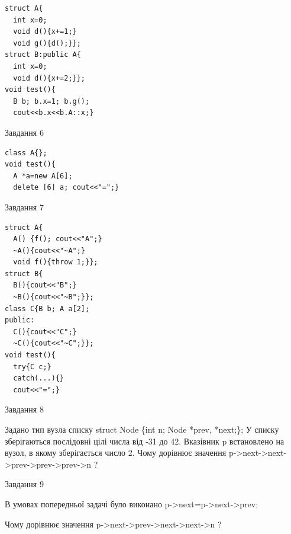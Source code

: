 \documentclass[12pt, ukrainian]{article}
\begin{document}
{{{{{{{{{{{{{{{{\begin{minipage}[t]{7cm}
\begin{verbatim}
struct A{
  int x=0;
  void d(){x+=1;}
  void g(){d();}};
struct B:public A{
  int x=0;
  void d(){x+=2;}};
void test(){
  B b; b.x=1; b.g();
  cout<<b.x<<b.A::x;}
\end{verbatim}            


               
{\begin{center}Завдання {6}\end{center}}
\vspace{-6mm}

\begin{verbatim}
class A{};
void test(){
  A *a=new A[6]; 
  delete [6] a; cout<<"=";}
\end{verbatim}            


               
{\begin{center}Завдання {7}\end{center}}
\vspace{-6mm}

\begin{verbatim}
struct A{
  A() {f(); cout<<"A";}
  ~A(){cout<<"~A";} 
  void f(){throw 1;}};
struct B{
  B(){cout<<"B";}
  ~B(){cout<<"~B";}};
class C{B b; A a[2];
public:
  C(){cout<<"C";}
  ~C(){cout<<"~C";}};
void test(){
  try{C c;} 
  catch(...){} 
  cout<<"=";}
\end{verbatim}            


\end{minipage}
               
{\begin{center}Завдання {8}\end{center}}
\vspace{-6mm}
Задано тип вузла списку
struct Node \{int n; Node *prev, *next;\};
У списку зберігаються послідовні цілі числа від -31 до 42. Вказівник p встановлено на вузол, в якому зберігається число 2.
Чому дорівнює значення p->next->next->prev->prev->prev->n ?\par

               
{\begin{center}Завдання {9}\end{center}}
\vspace{-6mm}
В умовах попередньої задачі було виконано p->next=p->next->prev;

Чому дорівнює значення p->next->prev->next->next->n ?\par

\newpage
               
}}}}}}}}}}}}}}}}
\end{document}
